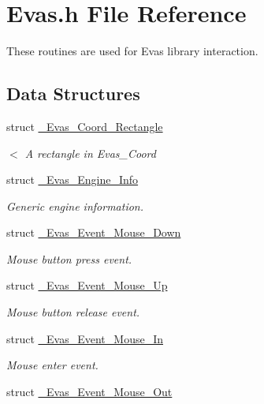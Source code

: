 \section{Evas.h File Reference}
\label{Evas_8h}


These routines are used for Evas library interaction.  


\subsection*{Data Structures}
\begin{DoxyCompactItemize}
\item 
struct \hyperlink{struct__Evas__Coord__Rectangle}{\_\-Evas\_\-Coord\_\-Rectangle}
\begin{DoxyCompactList}\small\item\em $<$ A rectangle in Evas\_\-Coord \item\end{DoxyCompactList}\item 
struct \hyperlink{struct__Evas__Engine__Info}{\_\-Evas\_\-Engine\_\-Info}
\begin{DoxyCompactList}\small\item\em Generic engine information. \item\end{DoxyCompactList}\item 
struct \hyperlink{struct__Evas__Event__Mouse__Down}{\_\-Evas\_\-Event\_\-Mouse\_\-Down}
\begin{DoxyCompactList}\small\item\em Mouse button press event. \item\end{DoxyCompactList}\item 
struct \hyperlink{struct__Evas__Event__Mouse__Up}{\_\-Evas\_\-Event\_\-Mouse\_\-Up}
\begin{DoxyCompactList}\small\item\em Mouse button release event. \item\end{DoxyCompactList}\item 
struct \hyperlink{struct__Evas__Event__Mouse__In}{\_\-Evas\_\-Event\_\-Mouse\_\-In}
\begin{DoxyCompactList}\small\item\em Mouse enter event. \item\end{DoxyCompactList}\item 
struct \hyperlink{struct__Evas__Event__Mouse__Out}{\_\-Evas\_\-Event\_\-Mouse\_\-Out}

\end{DoxyCompactItemize}
